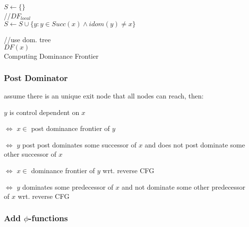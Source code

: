 \documentclass[8pt]{extarticle}
\begin{document}
\begin{multicols*}{2}
  \begin{algorithm}[H]
    $S \leftarrow \{\}$\\
    //$DF_{local}$\\
    $S \leftarrow S \cup \{ y: y \in Succ(x) \wedge idom(y) \neq x\}$

    //use dom. tree\\
    $DF(x)$\\
    \caption{Computing Dominance Frontier\label{Algo_dominance_frontier}}
  \end{algorithm}

  \subsubsection{Post Dominator}

  assume there is an unique exit node that all nodes can reach, then:

  $y$ is control dependent on $x$

  $\iff$ $x \in$ post dominance frontier of $y$

  $\iff$ $y$ post post dominates some successor of $x$ and does not post dominate some other successor of $x$

  $\iff$ $x\in$ dominance frontier of $y$ wrt. reverse CFG
  
  $\iff$ $y$ dominates some predecessor of $x$ and not dominate some other predecessor of $x$ wrt. reverse CFG
  
  \subsubsection{Add $\phi$-functions \cite{appelbook}}


\end{multicols*}
\end{document}
